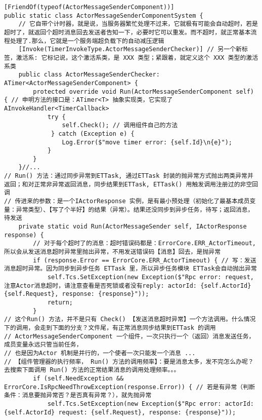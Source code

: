 \documentclass[9pt, b5paper]{article}
\begin{document}
\begin{verbatim}
[FriendOf(typeof(ActorMessageSenderComponent))]
public static class ActorMessageSenderComponentSystem {
    // 它自带个计时器，就是说，当服务器繁忙处理不过来，它就极有可能会自动超时，若是超时了，就返回个超时消息回去发送者告知一下，必要时它可以重发。而不超时，就正常基本流程处理了.那么，它就是一个服务端超负载下的自动减压逻辑
    [Invoke(TimerInvokeType.ActorMessageSenderChecker)] // 另一个新标签，激活系: 它标记说，这个激活系类，是 XXX 类型；紧跟着，就定义这个 XXX 类型的激活系类
    public class ActorMessageSenderChecker: ATimer<ActorMessageSenderComponent> {
        protected override void Run(ActorMessageSenderComponent self) { // 申明方法的接口是：ATimer<T> 抽象实现类，它实现了 AInvokeHandler<TimerCallback>
            try {
                self.Check(); // 调用组件自己的方法
             } catch (Exception e) {
                Log.Error($"move timer error: {self.Id}\n{e}");
            }
        }
    }//...
// Run() 方法：通过同步异常到ETTask, 通过ETTask 封装的抛异常方式抛出两类异常并返回；和对正常非异常返回消息，同步结果到ETTask, ETTask() 用触发调用注册过的非空回调
// 传进来的参数：是一个IActorResponse 实例，是有最小预处理（初始化了最基本成员变量：异常类型）、【写了个半好】的结果（异常）。结果还没同步到异步任务，待写；返回消息，待发送
    private static void Run(ActorMessageSender self, IActorResponse response) { 
        // 对于每个超时了的消息：超时错误码都是：ErrorCore.ERR_ActorTimeout, 所以会从发送消息超时异常里抛出异常，不用发送错误码【消息】回去，是抛异常
        if (response.Error == ErrorCore.ERR_ActorTimeout) { // 写：发送消息超时异常。因为同步到异步任务 ETTask 里，所以异步任务模块 ETTask会自动抛出异常
            self.Tcs.SetException(new Exception($"Rpc error: request, 注意Actor消息超时，请注意查看是否死锁或者没有reply: actorId: {self.ActorId} {self.Request}, response: {response}"));
            return;
        }
// 这个Run() 方法，并不是只有 Check() 【发送消息超时异常】一个方法调用。什么情况下的调用，会走到下面的分支？文件尾，有正常消息同步结果到ETTask 的调用 
// ActorMessageSenderComponent 一个组件，一次只执行一个（返回）消息发送任务，成员变量永远只管当前任务，
// 也是因为Actor 机制是并行的，一个使者一次只能发一个消息 ...
// 【组件管理器的执行频率， Run() 方法的调用频率】：要是消息太多，发不完怎么办呢？去搜索下面调用 Run() 方法的正常结果消息的调用处理频率。。。
        if (self.NeedException && ErrorCore.IsRpcNeedThrowException(response.Error)) { // 若是有异常（判断条件：消息要抛异常否？是否真有异常？），就先抛异常
            self.Tcs.SetException(new Exception($"Rpc error: actorId: {self.ActorId} request: {self.Request}, response: {response}"));

\end{verbatim}
\end{document}
